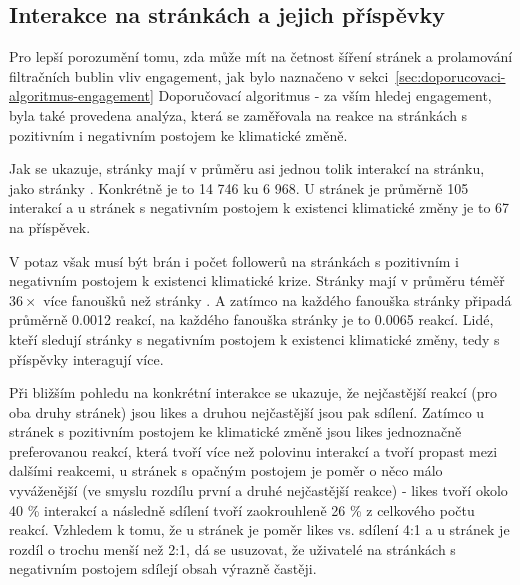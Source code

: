 
\subsection{Interakce na stránkách a jejich příspěvky}
\label{sec:interakce}
    Pro lepší porozumění tomu, zda může mít na četnost šíření stránek a prolamování filtračních bublin vliv engagement, jak bylo naznačeno v sekci~\ref{sec:doporucovaci-algoritmus-engagement} Doporučovací algoritmus - za vším hledej engagement, byla také provedena analýza, která se zaměřovala na reakce na stránkách s pozitivním i negativním postojem ke klimatické změně. 
    
    Jak se ukazuje, stránky  mají v průměru asi jednou tolik interakcí na stránku, jako stránky . Konkrétně je to 14 746 ku 6 968. U stránek  je průměrně 105 interakcí a u stránek s negativním postojem k existenci klimatické změny je to 67 na příspěvek. 
    
    V potaz však musí být brán i počet followerů na stránkách s pozitivním i negativním postojem k existenci klimatické krize. Stránky  mají v průměru téměř $36\times$ více fanoušků než stránky . A zatímco na každého fanouška stránky  připadá průměrně 0.0012 reakcí, na každého fanouška stránky  je to 0.0065 reakcí. Lidé, kteří sledují stránky s negativním postojem k existenci klimatické změny, tedy s příspěvky interagují více. 
    
    
    
    Při bližším pohledu na konkrétní interakce se ukazuje, že nejčastější reakcí (pro oba druhy stránek) jsou likes a druhou nejčastější jsou pak sdílení. Zatímco u stránek s pozitivním postojem ke klimatické změně jsou likes jednoznačně preferovanou reakcí, která tvoří více než polovinu interakcí a tvoří propast mezi dalšími reakcemi, u stránek s opačným postojem je poměr o něco málo vyváženější (ve smyslu rozdílu první a druhé nejčastější reakce) - likes tvoří okolo 40 \% interakcí a následně sdílení tvoří zaokrouhleně 26 \% z celkového počtu reakcí. Vzhledem k tomu, že u stránek  je poměr likes vs. sdílení 4:1 a u stránek  je rozdíl o trochu menší než 2:1, dá se usuzovat, že uživatelé na stránkách s negativním postojem sdílejí obsah výrazně častěji. 
    
